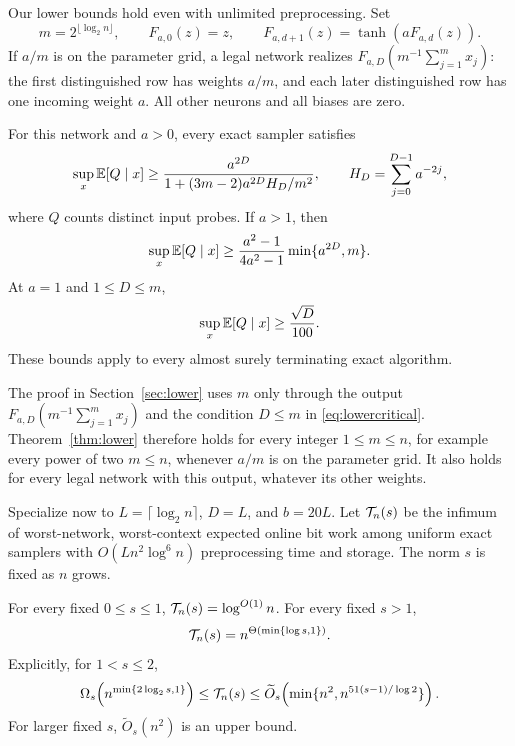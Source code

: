 Our lower bounds hold even with unlimited preprocessing. Set
\[
m=2^{\lfloor\log_2n\rfloor},\qquad
F_{a,0}(z)=z,\qquad F_{a,d+1}(z)=\tanh(aF_{a,d}(z)).
\]
If \(a/m\) is on the parameter grid, a legal network realizes
\(F_{a,D}(m^{-1}\sum_{j=1}^m x_j)\): the first distinguished row
has weights \(a/m\), and each later distinguished row has one
incoming weight \(a\). All other neurons and all biases are zero.

\begin{theorem}\label{thm:lower}
For this network and \(a>0\), every exact sampler satisfies
\begin{equation}\label{eq:lowerexact}
\sup_x\mathbb E[Q\mid x]\ge
\frac{a^{2D}}{1+(3m-2)a^{2D}H_D/m^2},
\qquad H_D=\sum_{j=0}^{D-1}a^{-2j},
\end{equation}
where \(Q\) counts distinct input probes. If \(a>1\), then
\begin{equation}\label{eq:lowersuper}
\sup_x\mathbb E[Q\mid x]\ge
\frac{a^2-1}{4a^2-1}\min\{a^{2D},m\}.
\end{equation}
At \(a=1\) and \(1\le D\le m\),
\begin{equation}\label{eq:lowercritical}
\sup_x\mathbb E[Q\mid x]\ge\frac{\sqrt D}{100}.
\end{equation}
These bounds apply to every almost surely terminating exact algorithm.
\end{theorem}

\begin{remark}\label{rem:lower-general-m}
The proof in Section~\ref{sec:lower} uses \(m\) only through the
output \(F_{a,D}(m^{-1}\sum_{j=1}^m x_j)\) and the condition
\(D\le m\) in \eqref{eq:lowercritical}. Theorem~\ref{thm:lower}
therefore holds for every integer \(1\le m\le n\), for example every
power of two \(m\le n\), whenever \(a/m\) is on the parameter grid.
It also holds for every legal network with this output, whatever its
other weights.
\end{remark}

Specialize now to \(L=\lceil\log_2n\rceil\), \(D=L\), and \(b=20L\).
Let \(\mathcal T_n(s)\) be the infimum of worst-network, worst-context
expected online bit work among uniform exact samplers with
\(O(Ln^2\log^6n)\) preprocessing time and storage. The norm \(s\)
is fixed as \(n\) grows.

\begin{corollary}\label{cor:threshold}
For every fixed \(0\le s\le1\), \(\mathcal T_n(s)=\log^{O(1)}n\).
For every fixed \(s>1\),
\begin{equation}\label{eq:dichotomy}
\mathcal T_n(s)=n^{\Theta(\min\{\log s,1\})}.
\end{equation}
Explicitly, for \(1<s\le2\),
\begin{equation}\label{eq:explicitexponents}
\Omega_s\!\left(n^{\min\{2\log_2s,1\}}\right)
\le\mathcal T_n(s)\le
\widetilde O_s\!\left(\min\{n^2,n^{51(s-1)/\log2}\}\right).
\end{equation}
For larger fixed \(s\), \(\widetilde O_s(n^2)\) is an upper bound.
\end{corollary}

